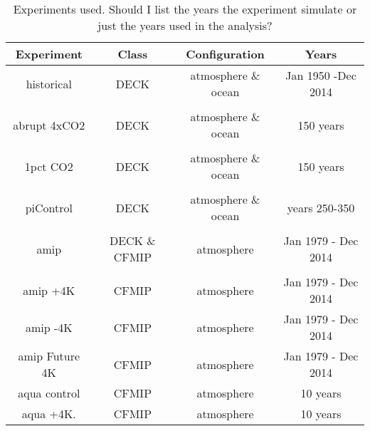 \documentclass[draft]{agujournal2019}
\begin{document}
 \begin{table}
\begin{center}
\caption{Experiments used.   Should I list the years the experiment simulate or just the years used in the analysis?}
    \begin{tabular}{*{4}{c}}
    \hline
    \hline
 Experiment & Class & Configuration & Years   \\ \hline
    historical        &   DECK      &  atmosphere \& ocean   &  Jan 1950 -Dec 2014               \\ 
    \\
    abrupt 4xCO2   & DECK       &  atmosphere \& ocean       & 150 years  \\  
    \\
    1pct CO2   & DECK        &  atmosphere \& ocean  & 150 years \\  
    \\
    piControl  & DECK   &  atmosphere \& ocean  &   years 250-350  \\  
    \\
    amip  & DECK \& CFMIP   &  atmosphere   & Jan 1979 - Dec 2014  \\  
    \\
    amip +4K  & CFMIP       &  atmosphere   & Jan 1979 - Dec 2014  \\ 
    amip -4K   & CFMIP       &  atmosphere   & Jan 1979 - Dec 2014 \\ 
    amip Future 4K  & CFMIP  & atmosphere & Jan 1979 - Dec 2014 \\
    aqua control        & CFMIP  & atmosphere  & 10 years \\
    aqua +4K.  & CFMIP    & atmosphere  &  10 years \\ \hline

    \end{tabular}\par
    \label{tab:exps}
\end{center}
\end{table}
\end{document}
